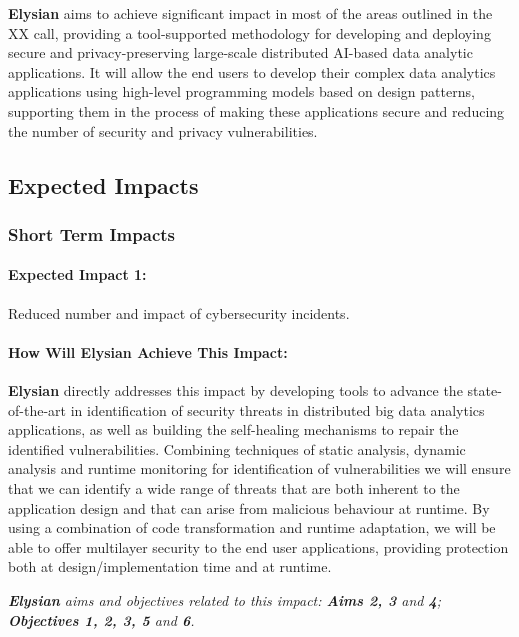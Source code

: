 \documentclass[a4paper,11pt]{article}
\newcommand{\project}[1]{\textbf{#1}\xspace}
\newcommand{\SECURITY}{\project{Elysian}}
\newcommand{\TheProject}{\SECURITY}
\begin{document}
\TheProject{} aims to achieve significant impact in most of the areas outlined in the XX call, providing a tool-supported methodology for developing and deploying secure and privacy-preserving large-scale distributed AI-based data analytic applications. It will allow the end users to develop their complex data analytics applications using high-level programming models based on design patterns, supporting them in the process of making these applications secure and reducing the number of security and privacy vulnerabilities.  

\subsection{Expected Impacts}

\subsubsection{Short Term Impacts}

\begin{mdframed}[backgroundcolor=blue!5]
\paragraph{Expected Impact 1:}
Reduced number and impact of cybersecurity incidents.
\end{mdframed}

\begin{mdframed}[backgroundcolor=gray!10]
\paragraph{How Will \TheProject{} Achieve This Impact:}
\TheProject{} directly addresses this impact by developing tools to advance the state-of-the-art in identification of security threats in distributed big data analytics applications, as well as building the self-healing mechanisms to repair the identified vulnerabilities. Combining techniques of static analysis, dynamic analysis and runtime monitoring for identification of vulnerabilities we will ensure that we can identify a wide range of threats that are both inherent to the application design and that can arise from malicious behaviour at runtime. By using a combination of code transformation and runtime adaptation, we will be able to offer multilayer security to the end user applications, providing protection both at design/implementation time and at runtime.

\emph{\TheProject{} aims and objectives related to this impact: \textbf{Aims 2, 3 } and \textbf{4}; \textbf{Objectives 1, 2, 3, 5} and \textbf{6}.}
\end{mdframed}
\end{document}

